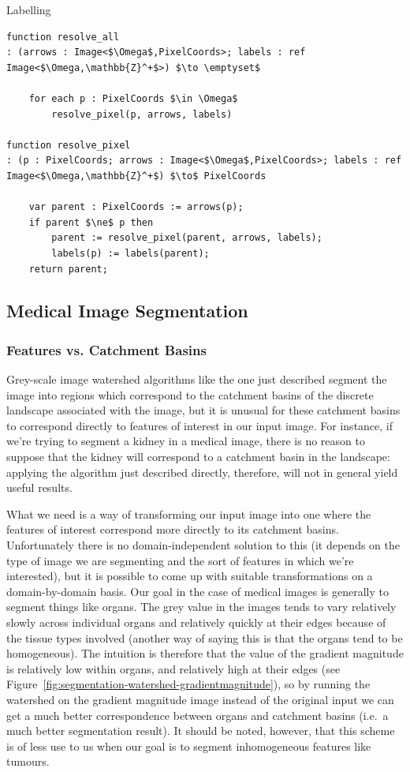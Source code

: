 \begin{stulisting}[t]
\caption{Labelling}
\label{code:segmentation-watershed-labelling}
\begin{lstlisting}[style=Default]
function resolve_all
: (arrows : Image<$\Omega$,PixelCoords>; labels : ref Image<$\Omega,\mathbb{Z}^+$>) $\to \emptyset$

	for each p : PixelCoords $\in \Omega$
		resolve_pixel(p, arrows, labels)

function resolve_pixel
: (p : PixelCoords; arrows : Image<$\Omega$,PixelCoords>; labels : ref Image<$\Omega,\mathbb{Z}^+$) $\to$ PixelCoords

	var parent : PixelCoords := arrows(p);
	if parent $\ne$ p then
		parent := resolve_pixel(parent, arrows, labels);
		labels(p) := labels(parent);
	return parent;
\end{lstlisting}
\end{stulisting}

\subsection{Medical Image Segmentation}

\subsubsection{Features vs. Catchment Basins}

Grey-scale image watershed algorithms like the one just described segment the image into regions which correspond to the catchment basins of the discrete landscape associated with the image, but it is unusual for these catchment basins to correspond directly to features of interest in our input image. For instance, if we're trying to segment a kidney in a medical image, there is no reason to suppose that the kidney will correspond to a catchment basin in the landscape: applying the algorithm just described directly, therefore, will not in general yield useful results.

What we need is a way of transforming our input image into one where the features of interest correspond more directly to its catchment basins. Unfortunately there is no domain-independent solution to this (it depends on the type of image we are segmenting and the sort of features in which we're interested), but it is possible to come up with suitable transformations on a domain-by-domain basis. Our goal in the case of medical images is generally to segment things like organs. The grey value in the images tends to vary relatively slowly across individual organs and relatively quickly at their edges because of the tissue types involved (another way of saying this is that the organs tend to be homogeneous). The intuition is therefore that the value of the gradient magnitude is relatively low within organs, and relatively high at their edges (see Figure~\ref{fig:segmentation-watershed-gradientmagnitude}), so by running the watershed on the gradient magnitude image instead of the original input we can get a much better correspondence between organs and catchment basins (i.e.~a much better segmentation result). It should be noted, however, that this scheme is of less use to us when our goal is to segment inhomogeneous features like tumours.

